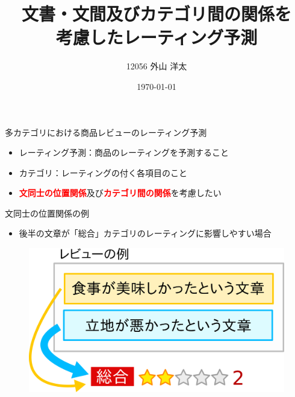 \documentclass[aspectratio=43,unicode,10pt]{beamer}
\title{文書・文間及びカテゴリ間の関係を\\考慮したレーティング予測}
\institute{知能数理研究室}
\author{12056 外山 洋太}
\date{\today}
\newcommand{\fire}[1]{\textcolor{red}{\textbf{#1}}}
\begin{document}
\begin{frame}
\titlepage
\end{frame}

\begin{frame}{多カテゴリにおける商品レビューのレーティング予測}{}
  \begin{itemize}
    \item レーティング予測：商品のレーティングを予測すること
    \item カテゴリ：レーティングの付く各項目のこと
    \item \fire{文同士の位置関係}及び\fire{カテゴリ間の関係}を考慮したい
  \end{itemize}
  \begin{figure}
    \fboxsep=2mm
  \end{figure}
\end{frame}

\begin{frame}{文同士の位置関係の例}{}
  \begin{itemize}
    \item 後半の文章が「総合」カテゴリのレーティングに影響しやすい場合
  \end{itemize}
  \begin{figure}
    \includegraphics[width=0.8\linewidth]
                    {fig/global_relations_among_sentences.png}
  \end{figure}
\end{frame}
\end{document}
